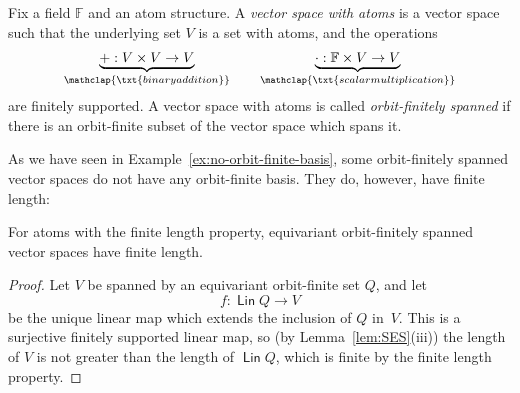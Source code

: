 \documentclass[10pt,a4paper]{amsart}
\numberwithin{equation}{section}
\newcommand{\myunderbrace}[2]{\underbrace{#1}_{\mathclap{\txt{\scriptsize #2}}}}
\DeclareMathOperator{\lin}{\mathsf{Lin}}
\newcommand{\field}{\mathbb F}
\begin{document}
\begin{definition} Fix a field $\field$ and an atom structure.
    A \emph{vector space with atoms} is a vector space  such that the underlying set $V$ is a set with atoms, and the operations
    \begin{align*}
    \myunderbrace{+ : V \times V \to V}{binary addition} \qquad 
    \myunderbrace{\cdot : \field \times V \to V}{scalar multiplication}
    \end{align*}
    are finitely supported.  A vector space with atoms is called \emph{orbit-finitely spanned} if there is an orbit-finite subset of the vector space which spans it.
\end{definition}

As we have seen in Example~\ref{ex:no-orbit-finite-basis}, some orbit-finitely spanned vector spaces do not have any orbit-finite basis.
They do, however, have finite length:

\begin{lemma}\label{lem:finite-length-for-ofs}
For atoms with the finite length property,  equivariant orbit-finitely spanned vector spaces have finite length.
\end{lemma}
\begin{proof}
Let $V$ be spanned by an equivariant orbit-finite set $Q$, and let
\[ f \colon \lin Q \to V \]
be the unique linear map which extends the inclusion of $Q$ in~$V$.
This is a surjective finitely supported linear map, so (by Lemma~\ref{lem:SES}(iii)) the length of $V$ is not greater than the length of $\lin Q$, which is finite by the finite length property.
\end{proof}
\end{document}
